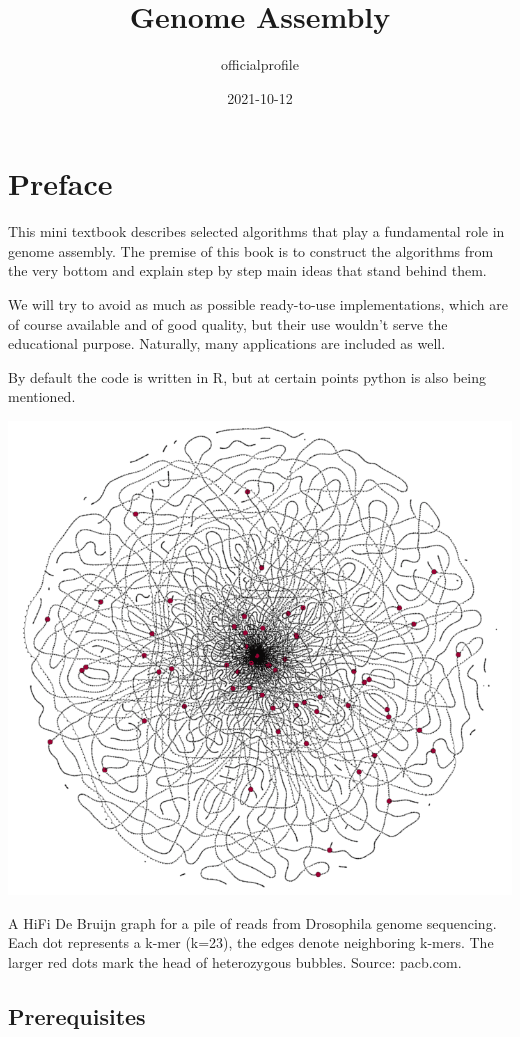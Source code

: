 \documentclass[
]{book}
\title{Genome Assembly}
\author{officialprofile}
\date{2021-10-12}
\begin{document}
\maketitle

{
\setcounter{tocdepth}{1}
\tableofcontents
}
\hypertarget{preface}{%
\chapter{Preface}\label{preface}}

This mini textbook describes selected algorithms that play a fundamental role in genome assembly. The premise of this book is to construct the algorithms from the very bottom and explain step by step main ideas that stand behind them.

We will try to avoid as much as possible ready-to-use implementations, which are of course available and of good quality, but their use wouldn't serve the educational purpose. Naturally, many applications are included as well.

By default the code is written in R, but at certain points python is also being mentioned.

\begin{center}\includegraphics[width=0.8\linewidth]{img/cover} \end{center}

A HiFi De Bruijn graph for a pile of reads from Drosophila genome sequencing. Each dot represents a k-mer (k=23), the edges denote neighboring k-mers. The larger red dots mark the head of heterozygous bubbles. Source: pacb.com.

\hypertarget{prerequisites}{%
\section{Prerequisites}\label{prerequisites}}
\end{document}
